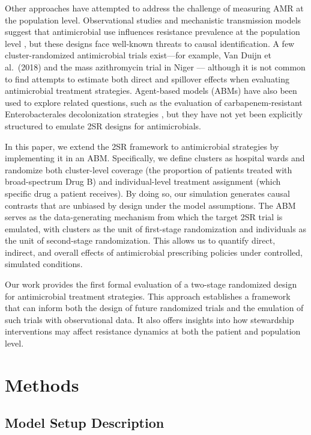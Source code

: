 \documentclass[preprint,11pt]{elsarticle}
\begin{document}
Other approaches have attempted to address the challenge of measuring AMR at the population level. Observational studies and mechanistic transmission models suggest that antimicrobial use influences resistance prevalence at the population level \citep{pham_characterizing_2025, olesen_role_2020, lipsitch_epidemiology_2000}, but these designs face well-known threats to causal identification. A few cluster-randomized antimicrobial trials exist---for example, Van Duijn et al.\ (2018) \citep{duijn_effects_2018} and the mass azithromycin trial in Niger \citep{arzika_spillover_2025}--- although it is not common to find attempts to estimate both direct and spillover effects when evaluating antimicrobial treatment strategies. Agent-based models (ABMs) have also been used to explore related questions, such as the evaluation of carbapenem-resistant Enterobacterales decolonization strategies \citep{toth_economic_2021}, but they have not yet been explicitly structured to emulate 2SR designs for antimicrobials.

In this paper, we extend the 2SR framework to antimicrobial strategies by implementing it in an ABM. Specifically, we define clusters as hospital wards and randomize both cluster-level coverage (the proportion of patients treated with broad-spectrum Drug B) and individual-level treatment assignment (which specific drug a patient receives). By doing so, our simulation generates causal contrasts that are unbiased by design under the model assumptions. The ABM serves as the data-generating mechanism from which the target 2SR trial is emulated, with clusters as the unit of first-stage randomization and individuals as the unit of second-stage randomization. This allows us to quantify direct, indirect, and overall effects of antimicrobial prescribing policies under controlled, simulated conditions.

Our work provides the first formal evaluation of a two-stage randomized design for antimicrobial treatment strategies. This approach establishes a framework that can inform both the design of future randomized trials and the emulation of such trials with observational data. It also offers insights into how stewardship interventions may affect resistance dynamics at both the patient and population level.

\section{Methods}

\subsection{Model Setup Description}\label{MODEL}
\end{document}
